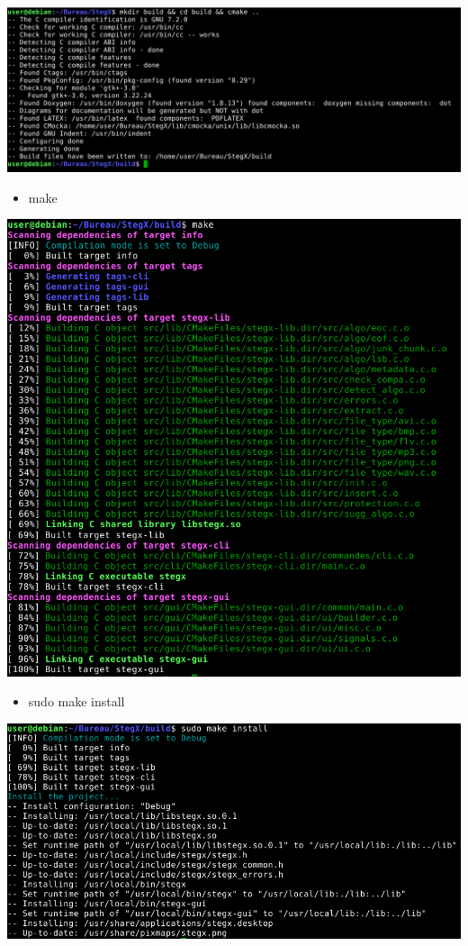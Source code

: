 \documentclass[11pt]{article}
\begin{document}
\hspace{1cm}
\includegraphics[scale=0.5]{pictures/build.png}
\vspace{0.5cm}

\begin{itemize}
\newpage
\item make
\end{itemize}

\hspace{2cm}
\vspace{0.5cm}
\includegraphics[scale=0.5]{pictures/make.png}


\begin{itemize}
\item sudo make install
\end{itemize}

\hspace{1cm}
\vspace{0.5cm}
\includegraphics[scale=0.5]{pictures/install.png}
\end{document}
